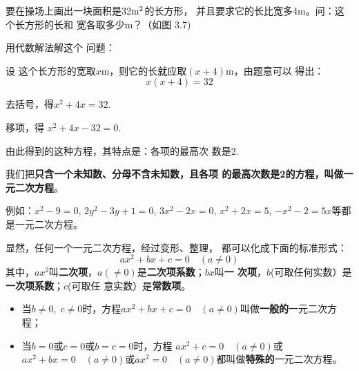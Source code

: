 要在操场上画出一块面积是32${\rm m}^2$的长方形，
并且要求它的长比宽多4m。问：这个长方形的长和
宽各取多少m？（如图
3.7)
\begin{figure}[htp]
    \centering
    \caption{}
\end{figure}


用代数解法解这个
问题：

设 这个长方形的宽取$x$m，则它的长就应取$(x+4)$m，由题意可以
得出：
\[x(x+4)=32\]

去括号，得$x^2+4x=32$.

移项，得 $x^2+4x-32=0$.

由此得到的这种方程，其特点是：各项的最高次
数是2.

我们把\textbf{只含一个未知数、分母不含未知数，且各项
的最高次数是2的方程，叫做一元二次方程}。

例如：$x^2-9=0$, $2y^2-3y+1=0$, $3x^2-2x=0$,
$x^2+2x=5$, $-x^2-2=5x$等都是一元二次方程。

显然，任何一个一元二次方程，经过变形、整理，
都可以化成下面的标准形式：
\[ax^2+bx+c=0\quad (a\ne 0)\]
其中，$ax^2$叫\textbf{二次项}，$a(\ne 0)$是\textbf{二次项系数}；$bx$叫\textbf{一
次项}，$b$(可取任何实数）是\textbf{一次项系数}；$c$(可取任
意实数）是\textbf{常数项}。
\begin{itemize}
    \item 当$b\ne 0,\; c\ne 0$时，方程$ax^2+bx+c=0\quad (a\ne 0)$叫做\textbf{一般的}一元二次方程；
    \item 当$b=0$或$c=0$或$b=c=0$时，方程
$ax^2+c=0\quad (a\ne 0)$或$ax^2+bx=0\quad (a\ne 0)$或$ax^2=0\quad (a\ne 
0)$都叫做\textbf{特殊的}一元二次方程。
\end{itemize}

